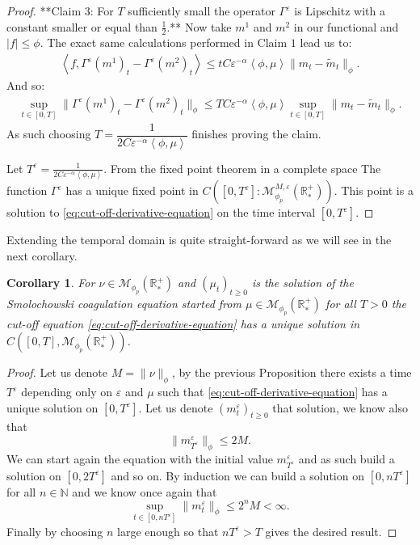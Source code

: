 \documentclass[11pt,a4paper]{article}
\newcommand{\NN}{\mathbb{N}}
\newcommand{\RRP}{\mathbb{R}^+_*}
\newcommand{\MC}{\mathcal{M}}
\newcommand{\Proc}[1]{\left(#1\right)_{t\geq 0}}
\newcommand{\brac}[1]{\left\langle#1\right\rangle}
\newtheorem{corollary}[theorem]{Corollary}
\begin{document}
\begin{proof}
    **Claim 3: For $T$ sufficiently small the operator $\Gamma^\varepsilon$ is Lipschitz with a constant smaller or equal than $\frac12$.** Now take $m^1$ and $m^2$ in our functional and $|f| \leq \phi$. The exact same calculations performed in Claim $1$ lead us to:
    \begin{align*}
        \brac{f, \Gamma^\varepsilon(m^1)_t - \Gamma^\varepsilon(m^2)_t}  \leq tC\varepsilon^{-\alpha}\brac{\phi,\mu} \| m_t - \tilde{m}_t\|_{\phi}.
    \end{align*}
    And so:
    \begin{align*}
        \sup\limits_{t \in [0,T]} \| \Gamma^\varepsilon(m^1)_t - \Gamma^\varepsilon(m^2)_t\|_{\phi}
        \leq TC\varepsilon^{-\alpha}\brac{\phi,\mu}\sup\limits_{t \in [0,T]} \| m_t - \tilde{m}_t\|_{\phi}.
    \end{align*}
    As such choosing $T = \dfrac{1}{2C\varepsilon^{-\alpha}\brac{\phi,\mu}}$ finishes proving the claim.

    Let $T^\varepsilon = \frac{1}{2C\varepsilon^{-\alpha}\brac{\phi,\mu}}$. From the fixed point theorem in a complete space The function $\Gamma^\varepsilon$ has a unique fixed point in \(C\left([0,T^\varepsilon]:\MC^{M,\varepsilon}_{\phi_p}\left(\RRP\right) \right) \). This point is a solution to \eqref{eq:cut-off-derivative-equation} on the time interval $[0,T^\varepsilon]$.
\end{proof}
Extending the temporal domain is quite straight-forward as we will see in the next corollary.
\begin{corollary}\label{cor:well-posedness-derivative-unbounded-space}
    For $\nu \in \MC_{\phi_p}(\RRP)$ and $\Proc{\mu_t}$ is the solution of the Smolochowski coagulation equation started from $\mu \in \MC_{\phi_p}(\RRP)$ for all $T > 0$ the cut-off equation \eqref{eq:cut-off-derivative-equation} has a unique solution in $C\left([0,T],\MC_{\phi_p}(\RRP)\right)$. 
\end{corollary}
\begin{proof}
    Let us denote \(M = \|\nu \|_{\phi}\), by the previous Proposition there exists a time $T^\varepsilon$ depending only on $\varepsilon$ and $\mu$ such that \eqref{eq:cut-off-derivative-equation} has a unique solution on \( [0,T^\varepsilon]\). Let us denote $\Proc{m^\varepsilon_t}$ that solution, we know also that 
    \[\|m^\varepsilon_{T^\varepsilon} \|_{\phi} \leq 2M.\]
    We can start again the equation with the initial value \(m^\varepsilon_{T^\varepsilon}\) and as such build a solution on \( [0,2T^\varepsilon]\) and so on. By induction we can build a solution on \( [0,nT^\varepsilon]\) for all $n \in \NN$ and we know once again that
    \[ \sup\limits_{t \in [0,n T^\varepsilon]}\|m^\varepsilon_{t} \|_{\phi} \leq 2^n M < \infty .\]
    Finally by choosing $n$ large enough so that \( n T^\varepsilon > T\) gives the desired result.
\end{proof}
\end{document}
